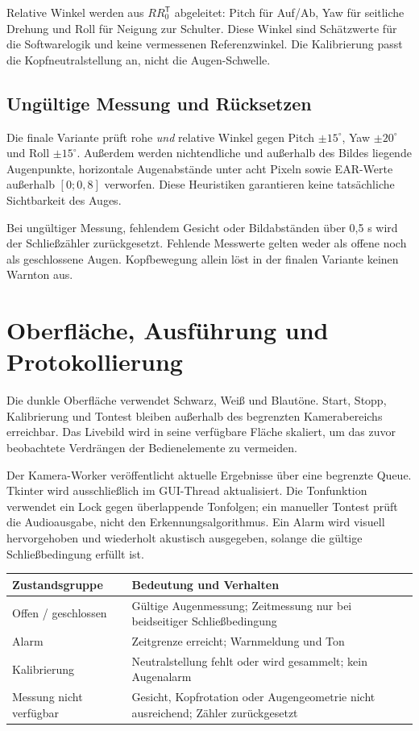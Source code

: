 \documentclass[11pt,a4paper]{article}
\begin{document}
Relative Winkel werden aus $R R_0^\mathsf{T}$ abgeleitet: Pitch für Auf/Ab, Yaw für seitliche Drehung und Roll für Neigung zur Schulter. Diese Winkel sind Schätzwerte für die Softwarelogik und keine vermessenen Referenzwinkel. Die Kalibrierung passt die Kopfneutralstellung an, nicht die Augen-Schwelle.
\subsection*{Ungültige Messung und Rücksetzen}
Die finale Variante prüft rohe \emph{und} relative Winkel gegen Pitch $\pm15^\circ$, Yaw $\pm20^\circ$ und Roll $\pm15^\circ$. Außerdem werden nichtendliche und außerhalb des Bildes liegende Augenpunkte, horizontale Augenabstände unter acht Pixeln sowie EAR-Werte außerhalb $[0;0{,}8]$ verworfen. Diese Heuristiken garantieren keine tatsächliche Sichtbarkeit des Auges.

Bei ungültiger Messung, fehlendem Gesicht oder Bildabständen über 0,5 s wird der Schließzähler zurückgesetzt. Fehlende Messwerte gelten weder als offene noch als geschlossene Augen. Kopfbewegung allein löst in der finalen Variante keinen Warnton aus.
\newpage
\section{Oberfläche, Ausführung und Protokollierung}
Die dunkle Oberfläche verwendet Schwarz, Weiß und Blautöne. Start, Stopp, Kalibrierung und Tontest bleiben außerhalb des begrenzten Kamerabereichs erreichbar. Das Livebild wird in seine verfügbare Fläche skaliert, um das zuvor beobachtete Verdrängen der Bedienelemente zu vermeiden.

Der Kamera-Worker veröffentlicht aktuelle Ergebnisse über eine begrenzte Queue. Tkinter wird ausschließlich im GUI-Thread aktualisiert. Die Tonfunktion verwendet ein Lock gegen überlappende Tonfolgen; ein manueller Tontest prüft die Audioausgabe, nicht den Erkennungsalgorithmus. Ein Alarm wird visuell hervorgehoben und wiederholt akustisch ausgegeben, solange die gültige Schließbedingung erfüllt ist.

\begin{tabularx}{\textwidth}{@{}p{42mm}Y@{}}\toprule
Zustandsgruppe & Bedeutung und Verhalten\\\midrule
Offen / geschlossen & Gültige Augenmessung; Zeitmessung nur bei beidseitiger Schließbedingung\\
Alarm & Zeitgrenze erreicht; Warnmeldung und Ton\\
Kalibrierung & Neutralstellung fehlt oder wird gesammelt; kein Augenalarm\\
Messung nicht verfügbar & Gesicht, Kopfrotation oder Augengeometrie nicht ausreichend; Zähler zurückgesetzt\\\bottomrule
\end{tabularx}
\end{document}
